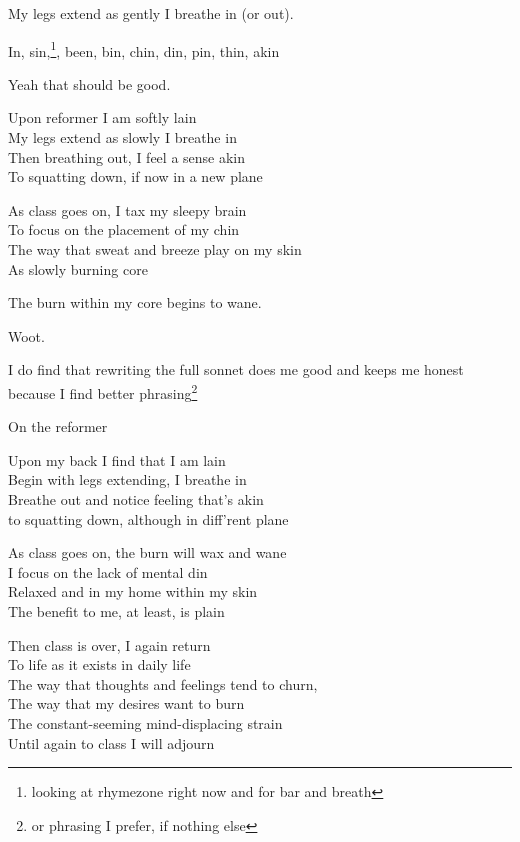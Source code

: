 \documentclass[12pt]{article}
\renewcommand{\,}{\textsuperscript{,}}
\begin{document}
\begin{itemize}
\begin{itemize}
\begin{itemize}
My legs extend as gently I breathe in (or out).

In, sin,\footnote{looking at rhymezone right now and for bar and breath}, been, bin, chin, din, pin, thin, akin

Yeah that should be good.

\hline

Upon reformer I am softly lain\\  
My legs extend as slowly I breathe in\\  
Then breathing out, I feel a sense akin\\  
To squatting down, if now in a new plane

\noindent As class goes on, I tax my sleepy brain\\  
To focus on the placement of my chin\\  
The way that sweat and breeze play on my skin\\  
As slowly burning core

\hline

The burn within my core begins to wane.

Woot.

I do find that rewriting the full sonnet does me good and keeps me honest because I find better phrasing\footnote{or phrasing I prefer, if nothing else}

On the reformer

\hline

Upon my back I find that I am lain\\  
Begin with legs extending, I breathe in\\  
Breathe out and notice feeling that's akin\\  
to squatting down, although in diff'rent plane

\noindent As class goes on, the burn will wax and wane\\  
I focus on the lack of mental din\\  
Relaxed and in my home within my skin\\  
The benefit to me, at least, is plain

\noindent Then class is over, I again return\\  
To life as it exists in daily life\\  
The way that thoughts and feelings tend to churn,\\  
The way that my desires want to burn\\  
The constant-seeming mind-displacing strain\\  
Until again to class I will adjourn


\end{itemize}
\end{itemize}
\end{itemize}
\end{document}
